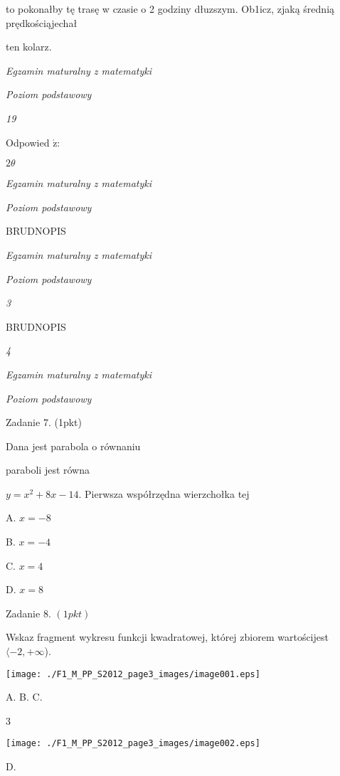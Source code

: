 \documentclass[a4paper,12pt]{article}
\begin{document}
to pokonałby tę trasę w czasie o 2 godziny dłuzszym. Ob1icz, zjaką średnią prędkościąjechał

ten kolarz.





{\it Egzamin maturalny z matematyki}

{\it Poziom podstawowy}

{\it 19}

Odpowied $\acute{\mathrm{z}}$:





$ 2\theta$

{\it Egzamin maturalny z matematyki}

{\it Poziom podstawowy}

BRUDNOPIS





{\it Egzamin maturalny z matematyki}

{\it Poziom podstawowy}

{\it 3}

BRUDNOPIS





{\it 4}

{\it Egzamin maturalny z matematyki}

{\it Poziom podstawowy}

Zadanie 7. (1pkt)

Dana jest parabola o równaniu

paraboli jest równa

$y=x^{2}+8x-14$. Pierwsza współrzędna wierzchołka tej

A. $x=-8$

B. $x=-4$

C. $x=4$

D. $x=8$

Zadanie 8. $(1pkt)$

Wskaz fragment wykresu funkcji kwadratowej, której zbiorem wartościjest $\langle-2,+\infty$).
\begin{center}
\texttt{[image: ./F1\_M\_PP\_S2012\_page3\_images/image001.eps]}
\end{center}
A.  B.  C.

3
\begin{center}
\texttt{[image: ./F1\_M\_PP\_S2012\_page3\_images/image002.eps]}
\end{center}
D.
\end{document}
